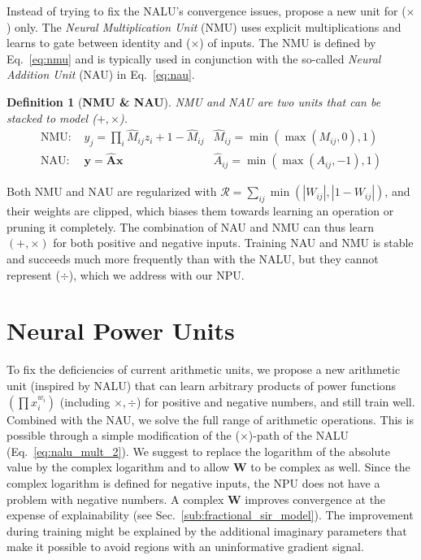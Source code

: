 \documentclass[9pt]{article}
\newtheorem*{definition}{Definition}
\begin{document}
Instead of trying to fix the NALU's convergence issues,
\cite{madsen_neural_2020} propose a new unit for ($\times$) only.
The \emph{Neural Multiplication Unit} (NMU) uses explicit multiplications and learns
to gate between identity and ($\times$) of inputs. The NMU is
defined by Eq.~\ref{eq:nmu} and is typically used in conjunction with the
so-called \emph{Neural Addition Unit} (NAU) in Eq.~\ref{eq:nau}.
\begin{definition}[{\bf NMU \& NAU}]
  NMU and NAU are two units that can be stacked to model ($+,\times$).
\begin{align}
  \label{eq:nmu}
  \text{NMU: } &y_j = \prod_i \hat M_{ij} z_{i} + 1 - \hat M_{ij}  & \hat M_{ij}=\min(\max(M_{ij}, 0), 1)\\
  \label{eq:nau}
  \text{NAU: } &\bm y = \bm{\hat{A}} \bm x & \hat A_{ij}=\min(\max(A_{ij}, -1), 1)
\end{align}
\end{definition}
Both NMU and NAU are regularized with $\mathcal{R} = \sum_{ij} \min(|W_{ij}|,
|1-W_{ij}|)$, and their weights are clipped, which biases them towards learning
an operation or pruning it completely.  The combination of NAU and NMU can thus
learn $(+,\times)$ for both positive and negative inputs. Training NAU and NMU
is stable and succeeds much more frequently than with the NALU, but they cannot
represent ($\div$), which we address with our NPU.


\section{Neural Power Units}%
\label{sec:neural_power_unit}

To fix the deficiencies of current arithmetic units, we propose a new
arithmetic unit (inspired by NALU) that can learn arbitrary products of power functions $(\prod x_{i}^{w_i})$ (including
$\times,\div$) for positive and negative numbers, and still train well.
Combined with the NAU, we solve the full range of arithmetic operations.
This is possible through a simple modification of the ($\times$)-path of the
NALU (Eq.~\ref{eq:nalu_mult_2}). 
We suggest to replace the logarithm of the absolute value by the complex logarithm and
to allow $\bm W$ to be complex as well. Since the complex logarithm is defined for
negative inputs, the NPU does not have a problem with negative numbers. A complex $\bm W$ 
improves convergence at the expense of explainability (see
Sec.~\ref{sub:fractional_sir_model}). The improvement during training might be
explained by the additional imaginary parameters that make it possible to avoid
regions with an uninformative gradient signal.
\end{document}
